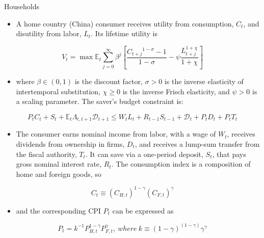 \documentclass[10pt]{beamer}
\begin{document}
\begin{frame}{Households}
\fontsize{8}{8}\selectfont

\begin{itemize}
    \item A home country (China) consumer receives utility from consumption, $C_{t}$, and disutility from labor, $L_{t}$. Its lifetime utility is
\end{itemize}


$$
V_{t}=\max \mathbb{E}_{t} \sum_{j=0}^{\infty} \beta^{j}\left[\frac{C_{t+j}{ }^{1-\sigma}-1}{1-\sigma}-\psi \frac{L_{t+j}^{1+\chi}}{1+\chi}\right]
$$

\begin{itemize}
    \item where $\beta \in(0,1)$ is the discount factor, $\sigma>0$ is the inverse elasticity of intertemporal substitution, $\chi \geq 0$ is the inverse Frisch elasticity, and $\psi>0$ is a scaling parameter. The saver's budget constraint is:
\end{itemize}


$$
P_{t} C_{t}+S_{t}+\mathbb{E}_{t} \Lambda_{t, t+1} \mathcal{D}_{t+1} \leq W_{t} L_{t}+R_{t-1} S_{t-1}+\mathcal{D}_{t}+P_{t} D_{t}+P_{t} T_{t}
$$



\begin{itemize}
    \item The consumer earns nominal income from labor, with a wage of $W_{t}$, receives dividends from ownership in firms, $D_{t}$, and receives a lump-sum transfer from the fiscal authority, $T_{t}$. It can save via a one-period deposit, $S_{t}$, that pays gross nominal interest rate, $R_{t}$. The consumption index is a composition of home and foreign goods, so
\end{itemize}



$$
C_{t}\equiv\left(C_{H, t}\right)^{1-\gamma}\left(C_{F, t}\right)^{\gamma}
$$

\begin{itemize}
    \item and the corresponding CPI $P_{t}$ can be expressed as
\end{itemize}

$$
P_{t}=k^{-1} P_{H, t}^{1-\gamma} P_{F, t}^{\gamma}, \ where \ k \equiv(1-\gamma)^{(1-\gamma)} \gamma^{\gamma}
$$

\end{frame}
\end{document}
